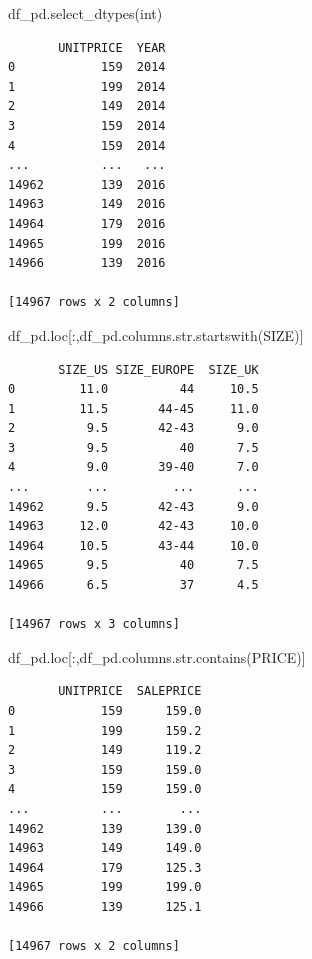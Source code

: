 \documentclass[
  letterpaper,
  DIV=11,
  numbers=noendperiod]{scrreprt}
\newenvironment{Shaded}{\begin{snugshade}}{\end{snugshade}}
\newcommand{\BuiltInTok}[1]{\textcolor[rgb]{0.00,0.23,0.31}{#1}}
\newcommand{\NormalTok}[1]{\textcolor[rgb]{0.00,0.23,0.31}{#1}}
\newcommand{\StringTok}[1]{\textcolor[rgb]{0.13,0.47,0.30}{#1}}
\begin{document}
\begin{Shaded}
\begin{Highlighting}[]
\NormalTok{df\_pd.select\_dtypes(}\StringTok{\textquotesingle{}int\textquotesingle{}}\NormalTok{)}
\end{Highlighting}
\end{Shaded}

\begin{verbatim}
       UNITPRICE  YEAR
0            159  2014
1            199  2014
2            149  2014
3            159  2014
4            159  2014
...          ...   ...
14962        139  2016
14963        149  2016
14964        179  2016
14965        199  2016
14966        139  2016

[14967 rows x 2 columns]
\end{verbatim}

\begin{Shaded}
\begin{Highlighting}[]
\NormalTok{df\_pd.loc[:,df\_pd.columns.}\BuiltInTok{str}\NormalTok{.startswith(}\StringTok{\textquotesingle{}SIZE\textquotesingle{}}\NormalTok{)]}
\end{Highlighting}
\end{Shaded}

\begin{verbatim}
       SIZE_US SIZE_EUROPE  SIZE_UK
0         11.0          44     10.5
1         11.5       44-45     11.0
2          9.5       42-43      9.0
3          9.5          40      7.5
4          9.0       39-40      7.0
...        ...         ...      ...
14962      9.5       42-43      9.0
14963     12.0       42-43     10.0
14964     10.5       43-44     10.0
14965      9.5          40      7.5
14966      6.5          37      4.5

[14967 rows x 3 columns]
\end{verbatim}

\begin{Shaded}
\begin{Highlighting}[]
\NormalTok{df\_pd.loc[:,df\_pd.columns.}\BuiltInTok{str}\NormalTok{.contains(}\StringTok{\textquotesingle{}PRICE\textquotesingle{}}\NormalTok{)]}
\end{Highlighting}
\end{Shaded}

\begin{verbatim}
       UNITPRICE  SALEPRICE
0            159      159.0
1            199      159.2
2            149      119.2
3            159      159.0
4            159      159.0
...          ...        ...
14962        139      139.0
14963        149      149.0
14964        179      125.3
14965        199      199.0
14966        139      125.1

[14967 rows x 2 columns]
\end{verbatim}
\end{document}
